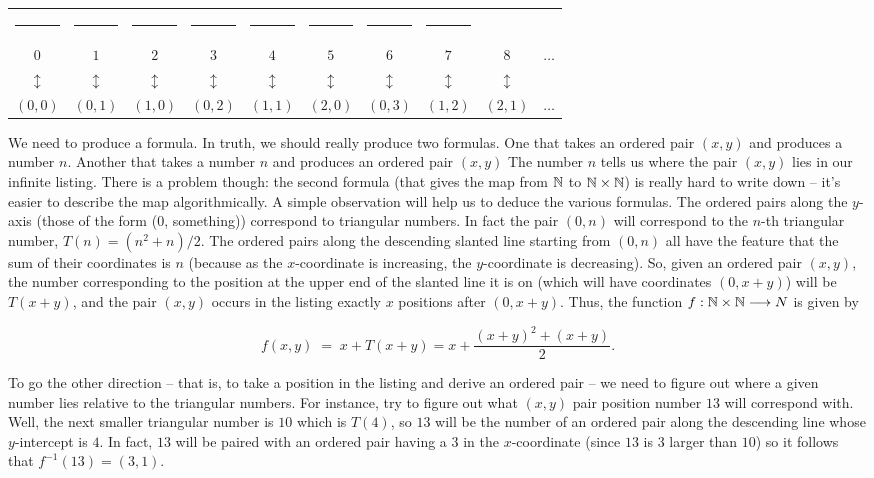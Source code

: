 \begin{tabular}{cccccccccc}
\rule{32pt}{0pt} & \rule{32pt}{0pt} & \rule{32pt}{0pt} & \rule{32pt}{0pt} & \rule{32pt}{0pt} & \rule{32pt}{0pt} & \rule{32pt}{0pt} & \rule{32pt}{0pt} \\
$0$ & $1$ & $2$ & $3$ & $4$ & $5$ & $6$ & $7$ & $8$ & $\ldots$ \\
$\updownarrow$ & $\updownarrow$ & $\updownarrow$ & $\updownarrow$ & $\updownarrow$ & $\updownarrow$ &  $\updownarrow$ & $\updownarrow$ & $\updownarrow$ & \\
$(0, 0)$ & $(0, 1)$ & $(1, 0)$ & $(0, 2)$ & $(1, 1)$ & $(2, 0)$ & $(0, 3)$ & $(1,2)$ & $(2, 1)$ & $\ldots$ \\
\end{tabular}
\medskip

We need to produce a formula. In truth, we should really produce two
formulas.  One that takes an ordered pair $(x, y)$ and produces a number $n$.
Another that takes a number $n$ and produces an ordered pair $(x, y)$ The
number $n$ tells us where the pair $(x, y)$ lies in our infinite listing.  
There is a
problem though: the second formula (that gives the map from ${\mathbb N}$  
to ${\mathbb N} \times {\mathbb N}$)
is really hard to write down -- it's easier to describe the map 
algorithmically. 
 A simple observation will help us to deduce the various formulas.  The
ordered pairs along the $y$-axis (those of the form (0, something)) correspond
to triangular numbers.  In fact the pair $(0, n)$ will correspond to the $n$-th triangular
number, $T(n) = (n^2 + n)/2$.  The ordered pairs along the descending
slanted line starting from $(0, n)$  all have the feature that the sum of their
coordinates is $n$ (because as the $x$-coordinate is increasing, the 
$y$-coordinate
is decreasing).  So, given an ordered pair $(x, y)$, the number corresponding
to the position at the upper end of the slanted line it is on (which will have
coordinates $(0, x+y)$) will be $T(x+y)$, and the pair $(x, y)$ occurs in the listing exactly $x$ positions after $(0, x + y)$.  Thus, the function 
$f : {\mathbb N} \times {\mathbb N} \longrightarrow N$ is
given by

\[ f(x, y) \; = \; x + T(x + y) = x + \frac{(x + y)^2 + (x + y)}{2}. \]

\noindent To go the other direction -- that is, to take a position 
in the listing and
derive an ordered pair -- we need to figure out where a given number lies
relative to the triangular numbers.  For instance, try to figure out what
$(x, y)$ pair position number $13$ will correspond with.  Well, the next smaller
triangular number is $10$ which is $T(4)$, so $13$ will be the number of an 
ordered pair along the descending line whose $y$-intercept is $4$.  
In fact, $13$ will be paired
with an ordered pair having a $3$ in the $x$-coordinate (since $13$ is $3$ 
larger than $10$) so it follows that $f^{-1}(13) = (3, 1)$.

